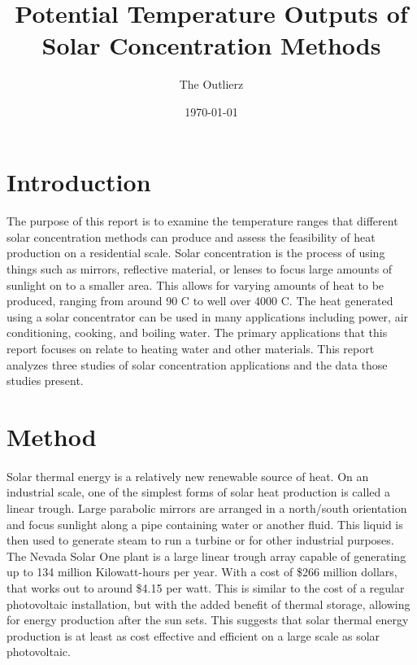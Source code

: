 \documentclass{article}
\title{Potential Temperature Outputs of Solar Concentration Methods}
\author{The Outlierz}
\date{\today}
\begin{document}
\maketitle


\section{Introduction}
    \paragraph{}
    The purpose of this report is to examine the temperature ranges that different solar concentration methods can 
    produce and assess the feasibility of heat production on a residential scale. 
    Solar concentration is the process of using things such as mirrors, reflective material, or 
    lenses to focus large amounts of sunlight on to a smaller area.  This allows for varying amounts 
    of heat to be produced, ranging from around 90 \degree C to well over 4000 \degree C. 
    The heat generated using a solar concentrator can be used in many applications including power, air 
    conditioning, cooking, and boiling water.
    The primary applications that this report focuses on relate to heating water and other materials.
    This report analyzes three studies of solar concentration applications and the data those studies present.

\section{Method}
    \paragraph{}
    Solar thermal energy is a relatively new renewable source of heat.  On an industrial scale, one of the simplest forms of solar heat 
    production is called a linear trough.  Large parabolic mirrors are arranged in a north/south orientation and focus sunlight along a 
    pipe containing water or another fluid.  This liquid is then used to generate steam to run a turbine or for other industrial purposes.
    The Nevada Solar One plant is a large linear trough array capable of generating up to 134 million Kilowatt-hours per year.  With a cost 
    of \$266 million dollars, that works out to around \$4.15 per watt.  This is similar to the cost of a regular photovoltaic installation,
    but with the added benefit of thermal storage, allowing for energy production after the sun sets.  This suggests that solar thermal energy
    production is at least as cost effective and efficient on a large scale as solar photovoltaic.\cite{Basking-in-the-Sun}
\end{document}
